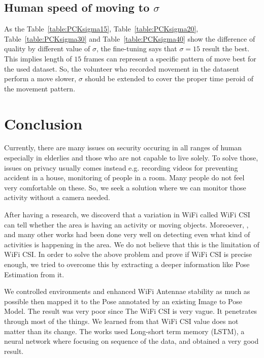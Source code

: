 \documentclass[10pt,letterpaper]{article}
\begin{document}
\subsection*{Human speed of moving to $\sigma$}

As the Table~\ref{table:PCKsigma15}, Table~\ref{table:PCKsigma20}, Table~\ref{table:PCKsigma30} and  Table~\ref{table:PCKsigma40} show the difference of quality by different value of $\sigma$, the fine-tuning says that $\sigma=15$ result the best. This implies length of $15$ frames can represent a specific pattern of move best for the used dataset. So, the volunteer who recorded movement in the datasent perform a move slower, $\sigma$ should be extended to cover the proper time peroid of the movement pattern.


 	\section*{Conclusion}

	Currently, there are many issues on security occuring in all ranges of human especially in elderlies and those who are not capable to live solely. To solve those, issues on privacy usually comes instead e.g. recording videos for preventing accident in a house, monitoring of people in a room. Many people do not feel very comfortable on these. So, we seek a solution where we can monitor those activity without a camera needed. 
	
	After having a research, we discoverd that a variation in WiFi called WiFi CSI can tell whether the area is having an activity or moving objects. Moreoever, \cite{chowdhuryTZ}, \cite{zouH} and many other works had been done very well on detecting even what kind of activities is happening in the area. We do not believe that this is the limitation of WiFi CSI. In order to solve the above problem and prove if WiFi CSI is precise enough, we tried to overcome this by extracting a deeper information like Pose Estimation from it. 
	
	We controlled environments and enhanced WiFi Antennae stability as much as possible then mapped it to the Pose annotated by an existing Image to Pose Model. The result was very poor since The WiFi CSI is very vague. It penetrates through most of the things. We learned from \cite{bib20} that WiFi CSI value does not matter than its change. The works used Long-short term memory (LSTM), a neural network where focusing on sequence of the data, and obtained a very good result. 
	
\end{document}

